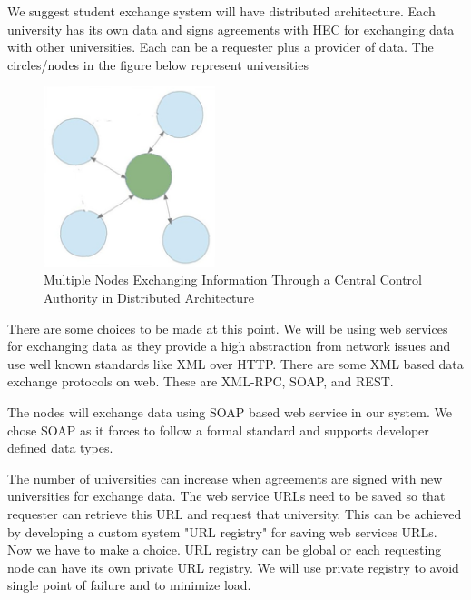 \documentclass[12pt,a4paper,oneside]{book}
\begin{document}
We suggest student exchange system will have distributed architecture. Each university has its own data and signs agreements with HEC for exchanging data with other universities. Each can be a requester plus a provider of data. The circles/nodes in the figure below represent universities

\begin{figure}[!htp]
  \centering
  \includegraphics[width=5cm]{architecture_distributed_exchange_through_hec.png}
  \caption{Multiple Nodes Exchanging Information Through a Central Control Authority in Distributed Architecture}
  \label{fig:architecture_distributed_exchange_through_hec}
\end{figure}

There are some choices to be made at this point. We will be using web services for exchanging data as they provide a high abstraction from network issues and use well known standards like XML over HTTP. There are some XML based data exchange protocols on web. These are XML-RPC, SOAP, and REST.

The nodes will exchange data using SOAP based web service in our system.  We chose SOAP as it forces to follow a formal standard and supports developer defined data types.

The number of universities can increase when agreements are signed with new universities for exchange data. The web service URLs need to be saved so that requester can retrieve this URL and request that university. This can be achieved by developing a custom system "URL registry" for saving web services URLs. Now we have to make a choice. URL registry can be global or each requesting node can have its own private URL registry. We will use private registry to avoid single point of failure and to minimize load.
\end{document}
